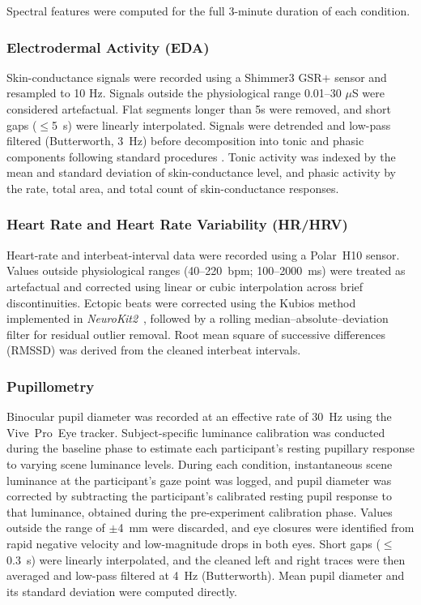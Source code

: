 \documentclass[lettersize,journal]{IEEEtran}
\begin{document}
Spectral features were computed for the full 3-minute duration of each condition.


\subsubsection{Electrodermal Activity (EDA)}
Skin-conductance signals were recorded using a Shimmer3 GSR$+$ sensor and resampled to 10 Hz. Signals outside the physiological range 0.01–30 $\mu$S were considered artefactual. Flat segments longer than 5s were removed, and short gaps ($\leq$5~s) were linearly interpolated. Signals were detrended and low-pass filtered (Butterworth, 3~Hz) before decomposition into tonic and phasic components following standard procedures \cite{makowskiNeuroKit2PythonToolbox2021}. Tonic activity was indexed by the mean and standard deviation of skin-conductance level, and phasic activity by the rate, total area, and total count of skin-conductance responses.

\subsubsection{Heart Rate and Heart Rate Variability (HR/HRV)}
Heart-rate and interbeat-interval data were recorded using a Polar~H10 sensor. Values outside physiological ranges (40--220~bpm; 100--2000~ms) were treated as artefactual and corrected using linear or cubic interpolation across brief discontinuities. Ectopic beats were corrected using the Kubios method~\cite{lipponenRobustAlgorithmHeart2019} implemented in \textit{NeuroKit2}~\cite{makowskiNeuroKit2PythonToolbox2021}, followed by a rolling median--absolute--deviation filter for residual outlier removal. Root mean square of successive differences (RMSSD) was derived from the cleaned interbeat intervals.

\subsubsection{Pupillometry}
Binocular pupil diameter was recorded at an effective rate of 30~Hz using the Vive~Pro~Eye tracker. 
Subject-specific luminance calibration was conducted during the baseline phase to estimate each participant’s resting pupillary response to varying scene luminance levels. During each condition, instantaneous scene luminance at the participant’s gaze point was logged, and pupil diameter was corrected by subtracting the participant’s calibrated resting pupil response to that luminance, obtained during the pre-experiment calibration phase.
Values outside the range of $\pm$4~mm were discarded, and eye closures were identified from rapid negative velocity and low-magnitude drops in both eyes. 
Short gaps ($\leq$0.3~s) were linearly interpolated, and the cleaned left and right traces were then averaged and low-pass filtered at 4~Hz (Butterworth).
Mean pupil diameter and its standard deviation were computed directly.
\end{document}
